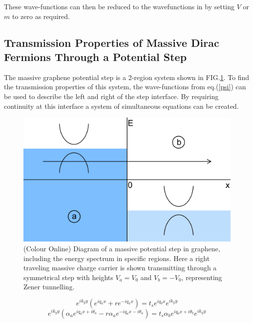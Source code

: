 \documentclass[prl,twocolumn,aps,superscriptaddress,floatfix,10pt]{revtex4}
\begin{document}
	These wave-functions can then be reduced to the wavefunctions in \cite{b5} by setting $V$ or $m$ to zero as required.

\subsection{Transmission Properties of Massive Dirac Fermions Through a Potential Step}

	The massive graphene potential step is a 2-region system shown in FIG.\ref{rectangular-step-flat}.	To find the transmission properties of this system, the wave-functions from eq.(\ref{psi}) can be used to describe the left and right of the step interface. By requiring continuity at this interface a system of simultaneous equations can be created.
\begin{figure}
	\includegraphics[scale=0.2]{rectangular-step-flat}
	\caption{(Colour Online) Diagram of a massive potential step in graphene, including the energy spectrum in specific regions. Here a right traveling massive charge carrier is shown transmitting through a symmetrical step with heights $V_{a}=V_{0}$ and $V_{b}=-V_{0}$, representing Zener tunnelling.}
	\label{rectangular-step-flat}
\end{figure}
\begin{equation}
	e^{ik_{y}y}\left(e^{iq_{a}x}+re^{-iq_{a}x}\right)=t_{s}e^{iq_{b}x}e^{ik_{y}y}
	\label{simultaneous equations 1}
\end{equation}
\begin{equation}
	e^{ik_{y}y}\left(\alpha_{a}e^{iq_{a}x+i\theta_{a}}-r\alpha_{a}e^{-iq_{a}x-i\theta_{a}}\right)=t_{s}\alpha_{b}e^{iq_{b}x+i\theta_{b}}e^{ik_{y}y}
	\label{simultaneous equations}
\end{equation}
\end{document}
